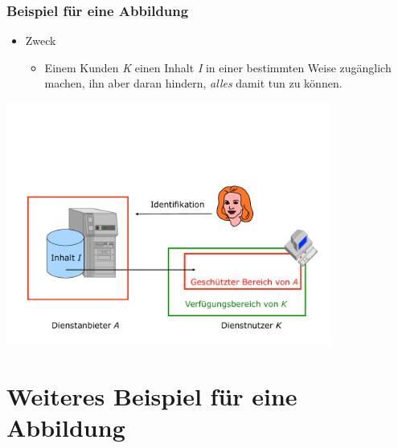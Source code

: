 \documentclass[t]{beamer}
\begin{document}
\begin{frame}
	\transwipe %
	\frametitle{Beispiel für eine Abbildung}
	\begin{itemize}
		\item Zweck
			\begin{itemize}
				\item Einem Kunden \emph{\color[RGB]{0,128,0} K} einen Inhalt \emph{\color{red} I} in einer bestimmten Weise zugänglich machen, ihn aber daran hindern, \emph{alles} damit tun zu können.
			\end{itemize}
	\end{itemize}
	\vspace{\fill}
	\begin{center}
		\includegraphics[width=0.8\textwidth]{../pic/abbildung2.pdf}
	\end{center}
\end{frame}

\section{Weiteres Beispiel für eine Abbildung} %
\end{document}
